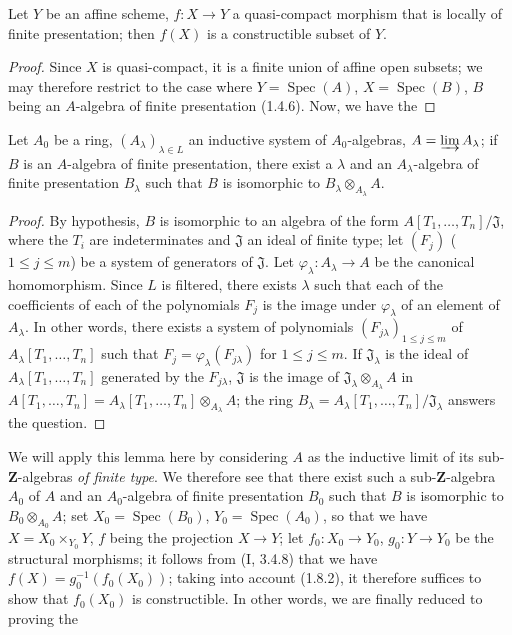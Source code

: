 \begin{lemma}[1.8.4.1]
\label{IV.1.8.4.1}
Let $Y$ be an affine scheme, $f:X\to Y$ a quasi-compact morphism that is
locally of finite presentation; then $f(X)$ is a constructible subset
of $Y$.
\end{lemma}

\begin{proof}
Since $X$ is quasi-compact, it is a finite union of affine open subsets; we
may therefore restrict to the case where $Y=\operatorname{Spec}(A)$,
$X=\operatorname{Spec}(B)$, $B$ being an $A$-algebra of finite presentation
(1.4.6). Now, we have the
\end{proof}

\begin{lemma}[1.8.4.2]
\label{IV.1.8.4.2}
Let $A_0$ be a ring, $(A_\lambda)_{\lambda\in L}$ an inductive system of
$A_0$-algebras, $A=\varinjlim A_\lambda$; if $B$ is an $A$-algebra of finite
presentation, there exist a $\lambda$ and an $A_\lambda$-algebra of finite
presentation $B_\lambda$ such that $B$ is isomorphic to
$B_\lambda\otimes_{A_\lambda}A$.
\end{lemma}

\begin{proof}
By hypothesis, $B$ is isomorphic to an algebra of the form
$A[T_1,\ldots,T_n]/\mathfrak J$, where the $T_i$ are indeterminates and
$\mathfrak J$ an ideal of finite type; let $(F_j)$ ($1\leq j\leq m$) be a
system of generators of $\mathfrak J$. Let
$\varphi_\lambda:A_\lambda\to A$ be the canonical homomorphism. Since $L$ is
filtered, there exists $\lambda$ such that each of the coefficients of each of
the polynomials $F_j$ is the image under $\varphi_\lambda$ of an element of
$A_\lambda$. In other words, there exists a system of polynomials
$(F_{j\lambda})_{1\leq j\leq m}$ of $A_\lambda[T_1,\ldots,T_n]$ such that
$F_j=\varphi_\lambda(F_{j\lambda})$ for $1\leq j\leq m$. If
$\mathfrak J_\lambda$ is the ideal of $A_\lambda[T_1,\ldots,T_n]$ generated
by the $F_{j\lambda}$, $\mathfrak J$ is the image of
$\mathfrak J_\lambda\otimes_{A_\lambda}A$ in
$A[T_1,\ldots,T_n]=A_\lambda[T_1,\ldots,T_n]\otimes_{A_\lambda}A$;
the ring $B_\lambda=A_\lambda[T_1,\ldots,T_n]/\mathfrak J_\lambda$ answers
the question.
\end{proof}

We will apply this lemma here by considering $A$ as the inductive limit of its
sub-$\mathbf Z$-algebras \emph{of finite type}. We therefore see that there
exist such a sub-$\mathbf Z$-algebra $A_0$ of $A$ and an $A_0$-algebra of
finite presentation $B_0$ such that $B$ is isomorphic to
$B_0\otimes_{A_0}A$; set $X_0=\operatorname{Spec}(B_0)$,
$Y_0=\operatorname{Spec}(A_0)$, so that we have $X=X_0\times_{Y_0}Y$,
$f$ being the projection $X\to Y$; let $f_0:X_0\to Y_0$,
$g_0:Y\to Y_0$ be the structural morphisms; it follows from (I, 3.4.8) that
we have $f(X)=g_0^{-1}(f_0(X_0))$; taking into account (1.8.2), it therefore
suffices to show that $f_0(X_0)$ is constructible. In other words, we are
finally reduced to proving the

